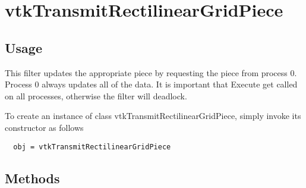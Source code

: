 \section{vtkTransmitRectilinearGridPiece}

\subsection{Usage}

 This filter updates the appropriate piece by requesting the piece from 
 process 0.  Process 0 always updates all of the data.  It is important that 
 Execute get called on all processes, otherwise the filter will deadlock.

To create an instance of class vtkTransmitRectilinearGridPiece, simply
invoke its constructor as follows
\begin{verbatim}
  obj = vtkTransmitRectilinearGridPiece
\end{verbatim}
\subsection{Methods}

